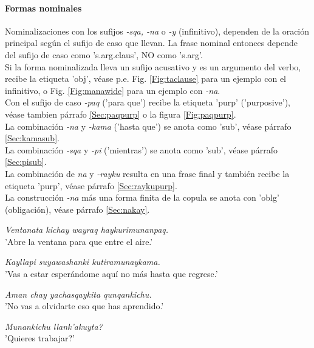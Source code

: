 \documentclass[a4paper,11pt,DIV12]{scrartcl}
\begin{document}
\paragraph{Formas nominales}\label{Sec:subordNom}
Nominalizaciones con los sufijos {\em -sqa, -na} o {\em -y} (infinitivo), dependen de la oraci\'on principal seg\'un el sufijo de caso que llevan. La frase nominal entonces depende del sufijo de caso como 's.arg.claus', NO como 's.arg'. \\
Si la forma nominalizada lleva un sufijo acusativo y es un argumento del verbo, recibe la etiqueta 'obj',
v\'ease p.e. Fig. \ref{Fig:taclause} para un ejemplo con el infinitivo, o Fig. \ref{Fig:manawide} para un ejemplo con {\em -na}.\\
Con el sufijo de caso {\em -paq} ('para que') recibe la etiqueta 'purp' ('purposive'), v\'ease tambien p\'arrafo \ref{Sec:paqpurp} o la figura \ref{Fig:paqpurp}.\\
La combinaci\'on {\em -na} y {\em -kama} ('hasta que') se anota como 'sub', v\'ease p\'arrafo \ref{Sec:kamasub}.\\
La combinaci\'on {\em -sqa} y {\em -pi} ('mientras') se anota como 'sub', v\'ease p\'arrafo \ref{Sec:pisub}.\\
La combinaci\'on de {\em na} y {\em -rayku} resulta en una frase final y tambi\'en recibe la etiqueta 'purp', v\'ease p\'arrafo \ref{Sec:raykupurp}.\\
La construcci\'on {\em -na} m\'as una forma finita de la copula se anota con 'oblg' (obligaci\'on), v\'ease p\'arrafo \ref{Sec:nakay}.

\begin{examples}
 \item {\em Ventanata kichay wayraq haykurimunanpaq.}\\
      'Abre la ventana para que entre el aire.'
 \item {\em Kayllapi suyawashanki kutiramunaykama.}\\
      'Vas a estar esper\'andome aqu\'i no m\'as hasta que regrese.'
 \item {\em Aman chay yachasqaykita qunqankichu.}\\
      'No vas a olvidarte eso que has aprendido.'
 \item {\em Munankichu llank'akuyta?}\\
      '{\textquestiondown}Quieres trabajar?'\\
 	\hfill{\small \citep[209-214]{Cusi2}}
\end{examples}
\end{document}
